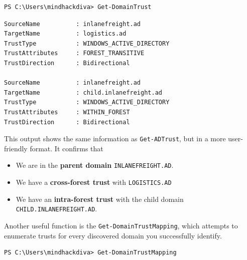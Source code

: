 \begin{notebox}
\begin{verbatim}
PS C:\Users\mindhackdiva> Get-DomainTrust
\end{verbatim}
\end{notebox}

\begin{notebox}
  \begin{verbatim}
SourceName          : inlanefreight.ad
TargetName          : logistics.ad
TrustType           : WINDOWS_ACTIVE_DIRECTORY
TrustAttributes     : FOREST_TRANSITIVE
TrustDirection      : Bidirectional

SourceName          : inlanefreight.ad
TargetName          : child.inlanefreight.ad
TrustType           : WINDOWS_ACTIVE_DIRECTORY
TrustAttributes     : WITHIN_FOREST
TrustDirection      : Bidirectional
\end{verbatim}
\end{notebox}

This output shows the same information as \texttt{Get-ADTrust}, but in a more user-friendly format. It confirms that
\begin{itemize}
    \item We are in the \textbf{parent domain} \texttt{INLANEFREIGHT.AD}.
    \item We have a \textbf{cross-forest trust} with \texttt{LOGISTICS.AD}
    \item We have an \textbf{intra-forest trust} with the child domain \texttt{CHILD.INLANEFREIGHT.AD}.
\end{itemize}

Another useful function is the \texttt{Get-DomainTrustMapping}, which attempts to enumerate trusts for every discovered domain you successfully identify.

\begin{notebox}
\begin{verbatim}
PS C:\Users\mindhackdiva> Get-DomainTrustMapping
\end{verbatim}
\end{notebox}

